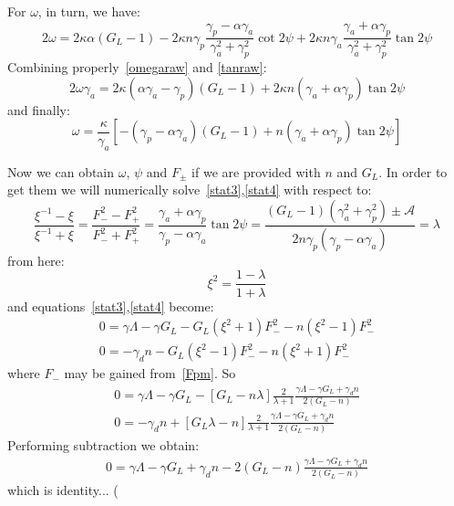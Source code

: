 \documentclass[12pt, notitlepage]{report}
\begin{document}
For $\omega$, in turn, we have:
\begin{equation}
	\label{omegaraw}
	2\omega = 2\kappa \alpha \left(G_L - 1\right) -  2\kappa n\gamma_p  \frac{\gamma_p - \alpha\gamma_a}{\gamma_a^2 + \gamma_p^2}\cot 2\psi +   2\kappa n \gamma_a\frac{\gamma_a + \alpha\gamma_p}{\gamma_a^2 + \gamma_p^2}\tan 2\psi
\end{equation}
Combining properly~\eqref{omegaraw} and \eqref{tanraw}:
\begin{equation}
	2\omega\gamma_a = 2\kappa \left(\alpha \gamma_a - \gamma_p\right)\left(G_L - 1\right) +   2\kappa n \left(\gamma_a + \alpha\gamma_p\right)\tan 2\psi
\end{equation}
and finally:
\begin{equation}
	\omega = \frac{\kappa}{\gamma_a} \left[-\left(\gamma_p - \alpha \gamma_a\right)\left(G_L - 1\right) +   n \left(\gamma_a + \alpha\gamma_p\right)\tan 2\psi\right]
\end{equation}

Now we can obtain $\omega$, $\psi$ and $F_\pm$ if we are provided with $n$ and $G_L$. In order to get them we will numerically solve~\eqref{stat3},\eqref{stat4} with respect to:
\begin{equation}
	\frac{\xi^{-1}-\xi}{\xi^{-1}+\xi} = \frac{F_-^2-F_+^2}{F_-^2 + F_+^2} = \frac{\gamma_a + \alpha\gamma_p}{\gamma_p - \alpha\gamma_a}\tan 2\psi = \frac{(G_L-1)(\gamma_a^2 + \gamma_p^2) \pm \mathcal{A}}{2n\gamma_p(\gamma_p - \alpha\gamma_a)} = \lambda
\end{equation}
from here:
\begin{equation}
	\xi^2 = \frac{1-\lambda}{1+\lambda}
\end{equation}
and equations~\eqref{stat3},\eqref{stat4} become:
\begin{gather}
	0 = \gamma\Lambda - \gamma G_L - G_L(\xi^2+1)F_-^2 - n(\xi^2 - 1)F_-^2 \\
	0 = -\gamma_d n - G_L(\xi^2-1)F_-^2 - n(\xi^2+1)F_-^2
\end{gather}
where $F_-$ may be gained from~\eqref{Fpm}. So
\begin{gather}
	0 = \gamma\Lambda - \gamma G_L - \left[G_L - n\lambda\right]\frac{2}{\lambda+1}\frac{\gamma \Lambda - \gamma G_L + \gamma_d n}{2(G_L - n)} \\
	0 = -\gamma_d n + \left[G_L\lambda - n\right]\frac{2}{\lambda+1}\frac{\gamma \Lambda - \gamma G_L + \gamma_d n}{2(G_L - n)}
\end{gather}
Performing subtraction we obtain:
\begin{gather}
	0 = \gamma\Lambda - \gamma G_L + \gamma_d n - 2(G_L - n)\frac{\gamma \Lambda - \gamma G_L + \gamma_d n}{2(G_L - n)}
\end{gather}
which is identity... (
\end{document}
